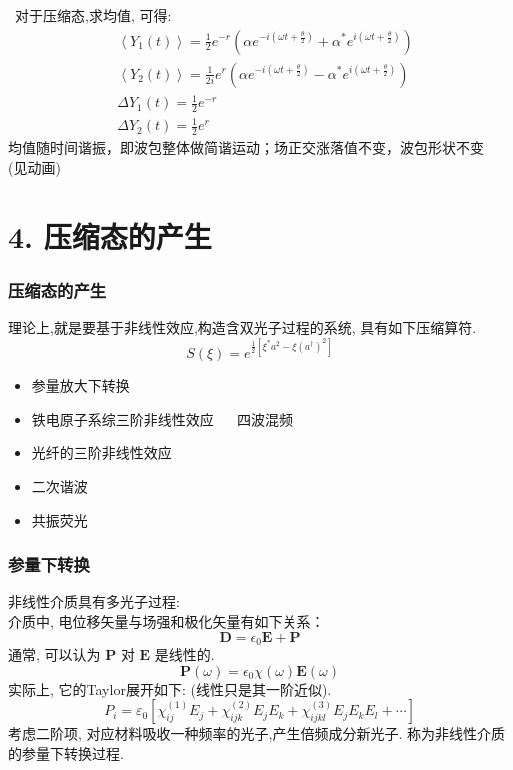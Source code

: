    \begin{frame}
    \frametitle{}
     对于压缩态,求均值, 可得: 
    \[ 
        \begin{aligned}
            &\left\langle Y_{1}(t)\right\rangle=\frac{1}{2} e^{-r}\left(\alpha e^{-i\left(\omega t+\frac{\theta}{2}\right)}+\alpha^{*} e^{i\left(\omega t+\frac{\theta}{2}\right)}\right) \\
            &\left\langle Y_{2}(t)\right\rangle=\frac{1}{2 i} e^{r}\left(\alpha e^{-i\left(\omega t+\frac{\theta}{2}\right)}-\alpha^{*} e^{i\left(\omega t+\frac{\theta}{2}\right)}\right) \\
            &\Delta Y_{1}(t)=\frac{1}{2} e^{-r} \\
            &\Delta Y_{2}(t)=\frac{1}{2} e^{r}
            \end{aligned} \]
    均值随时间谐振，即波包整体做简谐运动；场正交涨落值不变，波包形状不变  \\ 
    (见动画)
   \end{frame}

   \section{4. 压缩态的产生}

   \begin{frame}
    \frametitle{压缩态的产生}
  理论上,就是要基于非线性效应,构造含双光子过程的系统, 具有如下压缩算符. 
  \[ S(\xi) = e^{\frac{1}{2}[\xi^* a^2 - \xi (a^{\dagger}) ^2]}\]

  \begin{itemize}
      \item  参量放大下转换
      \item  铁电原子系综三阶非线性效应 ~~ 四波混频
      \item  光纤的三阶非线性效应
      \item  二次谐波
      \item 共振荧光
  \end{itemize}

  \end{frame}
  
  \begin{frame}
        \frametitle{参量下转换}
  非线性介质具有多光子过程: \\ 
  介质中, 电位移矢量与场强和极化矢量有如下关系：
  \[ \mathbf{D}=\epsilon_0 \mathbf{E} + \mathbf{P}  \]
  通常, 可以认为 $\mathbf{P}$ 对 $\mathbf{E}$ 是线性的. 
  \[\mathbf{P}(\omega)= \epsilon_0 \chi(\omega) \mathbf{E}(\omega) \]
  实际上, 它的Taylor展开如下: (线性只是其一阶近似).
  \[ P_{i}=\varepsilon_{0}\left[\chi_{i j}^{(1)} E_{j}+\chi_{i j k}^{(2)} E_{j} E_{k}+\chi_{i j k l}^{(3)} E_{j} E_{k} E_{l}+\cdots\right] \]
  考虑二阶项, 对应材料吸收一种频率的光子,产生倍频成分新光子. 称为非线性介质的参量下转换过程. 
\end{frame}

